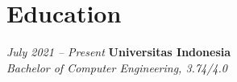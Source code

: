 \documentclass[../main.tex]{subfiles}
\begin{document}
\section{Education}

\begin{twocolentry}{
		\small
		\textit{July 2021 – Present}}
	\textbf{Universitas Indonesia} \\
	\textit{Bachelor of Computer Engineering, 3.74/4.0}
\end{twocolentry}
\end{document}
